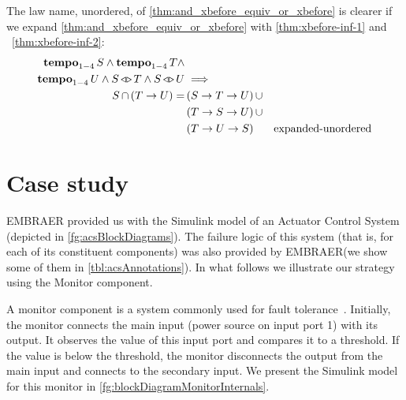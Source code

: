 \documentclass[en,twoside,onehalfspacing,phd]{risethesis}
\makeatletter
\newcommand{\todo}[1]{\@latex@warning{TODO #1}}
\newcommand{\EMBRAER}{EMBRAER\xspace}
\newcommand{\simulink}{Simulink\xspace}
\def\xbeforeop{\ensuremath\rightarrow}
\newcommand{\xbefore}[2]{\ensuremath #1 \xbeforeop #2 }
\def\tempoop{\ensuremath\operatorname{\mathbf{tempo}}}
\newcommand{\tempo}[2][1-4]{\ensuremath\tempoop_{#1} #2}
\def\independenteventsop{\ensuremath\operatorname{\triangleleft\triangleright}}
\newcommand{\independentevents}[2]{\ensuremath #1 \independenteventsop #2}
\newcommand{\parsin}[1]{\ensuremath\left( #1 \right)}
\def\union{\ensuremath\operatorname{\cup}}
\def\inter{\ensuremath\operatorname{\cap}}
\makeatother
\begin{document}
The law name, unordered, of \eqref{thm:and_xbefore_equiv_or_xbefore} is clearer if we expand \eqref{thm:and_xbefore_equiv_or_xbefore} with \eqref{thm:xbefore-inf-1} and ~\eqref{thm:xbefore-inf-2}:
%
\begin{align}
\tempo{S} \land \tempo{T} \land \nonumber\\
  \tempo{U} \land \independentevents{S}{T} \land \independentevents{S}{U} & \implies \nonumber\\
  S \inter \parsin{\xbefore{T}{U}} = &
  \parsin{\xbefore{\xbefore{S}{T}}{U}} \union \nonumber\\
  & \parsin{\xbefore{\xbefore{T}{S}}{U}} \union \nonumber\\
  & \parsin{\xbefore{\xbefore{T}{U}}{S}} &
  \text{expanded-unordered}
  \label{thm:and_xbefore_equiv_or_xbefore_expanded}
%
%
%
\end{align}
%


\chapter{Case study}
\label{sec:case-study}

\EMBRAER provided us with the \simulink model of an Actuator Control System (depicted in \cref{fg:acsBlockDiagrams}).
The failure logic of this system (that is, for each of its constituent components) was also provided by \EMBRAER (we show some of them in \cref{tbl:acsAnnotations}).
In what follows we illustrate our strategy using the Monitor component.

A monitor component is a system commonly used for fault tolerance~\cite{ONB2002,KK2007}.
Initially, the monitor connects the main input (power source on input port 1) with its output.
It observes the value of this input port and compares it to a threshold.
If the value is below the threshold, the monitor disconnects the output from the main input and connects to the secondary input.
We present the \simulink model for this monitor in \cref{fg:blockDiagramMonitorInternals}.
\end{document}
